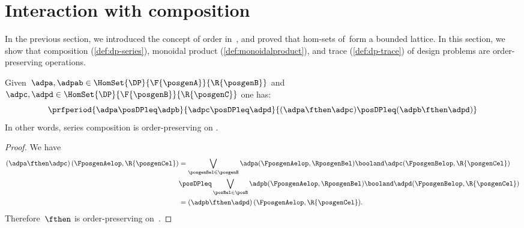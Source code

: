 
\section{Interaction with composition}
In the previous section, we introduced the concept of order in~\DP, and proved that hom-sets of~\DP form a bounded lattice.
In this section, we show that composition (\cref{def:dp-series}), monoidal product (\cref{def:monoidalproduct}), and trace (\cref{def:dp-trace}) of design problems are order-preserving operations.

\begin{lemma}
    \label{lem:series_pres_order}
    Given~$\adpa,\adpab \in \HomSet{\DP}{\F{\posgenA}}{\R{\posgenB}}$ and~$\adpc,\adpd \in \HomSet{\DP}{\F{\posgenB}}{\R{\posgenC}}$ one has:
    \begin{equation}
        \prfperiod{
            \adpa\posDPleq \adpb
        }{
            \adpc\posDPleq \adpd
        }{
            (\adpa\fthen \adpc) \posDPleq (\adpb\fthen \adpd)
        }
    \end{equation}
    In other words, series composition is order-preserving on \DP.
\end{lemma}

\begin{proof}
    We have
    \begin{equation}
        \label{eq:series_pres_ord}
        \begin{aligned}
            \left( \adpa\fthen \adpc\right)(\FposgenAelop,\R{\posgenCel}) & =
            \bigvee_{\posgenBel\in \posgenB}\adpa(\FposgenAelop,\RposgenBel)\booland \adpc(\FposgenBelop,\R{\posgenCel})                                                                      \\
                                                                          & \posDPleq \bigvee_{\posBel\in \posB} \adpb(\FposgenAelop,\RposgenBel)\booland \adpd(\FposgenBelop,\R{\posgenCel}) \\
                                                                          & =\left( \adpb\fthen \adpd\right)(\FposgenAelop,\R{\posgenCel}).
        \end{aligned}
    \end{equation}
    Therefore~$\fthen$ is order-preserving on~\DP.
\end{proof}

